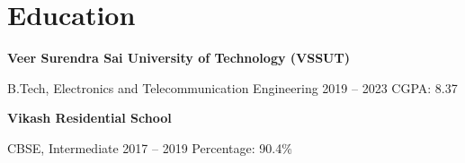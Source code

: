 \documentclass[letterpaper,11pt]{article}
\begin{document}
\section{Education}
{\large\textbf{Veer Surendra Sai University of Technology (VSSUT)}}\par
{\small B.Tech, Electronics and Telecommunication Engineering \textbar{} 2019 -- 2023 \textbar{} CGPA: 8.37}\par
\vspace{4pt}
{\large\textbf{Vikash Residential School}}\par
{\small CBSE, Intermediate \textbar{} 2017 -- 2019 \textbar{} Percentage: 90.4\%}\par
\end{document}
